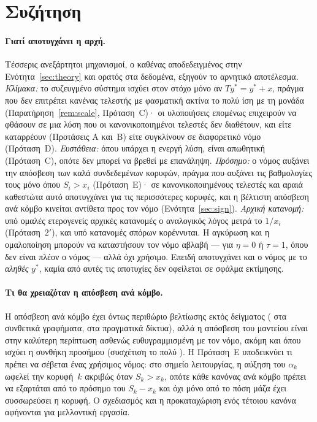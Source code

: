 \documentclass[11pt,a4paper]{article}
\theoremstyle{definition}
\theoremstyle{plain}
\begin{document}
\FloatBarrier
\section{Συζήτηση}\label{sec:discussion}

\paragraph{Γιατί αποτυγχάνει η αρχή.} Τέσσερις ανεξάρτητοι μηχανισμοί, ο καθένας αποδεδειγμένος στην Ενότητα~\ref{sec:theory} και ορατός στα δεδομένα, εξηγούν το αρνητικό αποτέλεσμα. \emph{Κλίμακα:} το συζευγμένο σύστημα ισχύει στον στόχο μόνο αν $Ty^*=y^*+x$, πράγμα που δεν επιτρέπει κανένας τελεστής με φασματική ακτίνα το πολύ ίση με τη μονάδα (Παρατήρηση~\ref{rem:scale}, Πρόταση~C)· οι υλοποιήσεις επομένως επιχειρούν να φθάσουν σε μια λύση που οι κανονικοποιημένοι τελεστές δεν διαθέτουν, και είτε καταρρέουν (Προτάσεις A και~B) είτε συγκλίνουν σε διαφορετικό νόμο (Πρόταση~D). \emph{Ευστάθεια:} όπου υπάρχει η ενεργή λύση, είναι απωθητική (Πρόταση~C), οπότε δεν μπορεί να βρεθεί με επανάληψη. \emph{Πρόσημο:} ο νόμος αυξάνει την απόσβεση των καλά συνδεδεμένων κορυφών, πράγμα που αυξάνει τις βαθμολογίες τους μόνο όπου $S_i>x_i$ (Πρόταση~E)· σε κανονικοποιημένους τελεστές και αραιά καθεστώτα αυτό αποτυγχάνει για τις περισσότερες κορυφές, και η βέλτιστη απόσβεση ανά κόμβο κινείται αντίθετα προς τον νόμο (Ενότητα~\ref{sec:sign}). \emph{Αρχική κατανομή:} υπό ομαλές ετερογενείς αρχικές κατανομές ο αναλογικός λόγος μετρά το $1/x_i$ (Πρόταση~$2'$), και υπό κατανομές σπόρων κορέννυται. Η αγκύρωση και η ομαλοποίηση μπορούν να καταστήσουν τον νόμο αβλαβή --- για $\eta=0$ ή $\tau=1$, όπου δεν είναι πλέον ο νόμος --- αλλά όχι χρήσιμο. Επειδή αποτυγχάνει και ο νόμος με το \emph{αληθές} $y^*$, καμία από αυτές τις αποτυχίες δεν οφείλεται σε σφάλμα εκτίμησης.

\paragraph{Τι θα χρειαζόταν η απόσβεση ανά κόμβο.} Η απόσβεση ανά κόμβο έχει όντως περιθώριο βελτίωσης εκτός δείγματος (\HeadAll{} στα συνθετικά γραφήματα, \RealHeadroom{} στα πραγματικά δίκτυα), αλλά η απόσβεση του μαντείου είναι στην καλύτερη περίπτωση ασθενώς ευθυγραμμισμένη με τον νόμο, ακόμη και όπου ισχύει η συνθήκη προσήμου (συσχέτιση το πολύ \SignMaxCorr). Η Πρόταση~E υποδεικνύει τι πρέπει να σέβεται ένας χρήσιμος νόμος: στο σημείο λειτουργίας, η αύξηση του $\alpha_k$ ωφελεί την κορυφή~$k$ ακριβώς όταν $S_k>x_k$, οπότε κάθε κανόνας ανά κόμβο πρέπει να εξαρτάται από το πρόσημο του $S_k-x_k$ και όχι μόνο από το πόση μάζα έχει συσσωρεύσει η κορυφή. Ο σχεδιασμός και η προκαταχώριση ενός τέτοιου κανόνα αφήνονται για μελλοντική εργασία.
\end{document}
